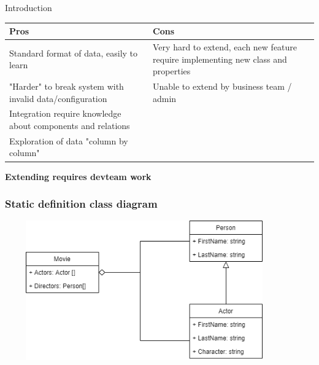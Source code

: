 \documentclass{beamer}
\begin{document}
\begin{section}{Introduction}
\begin{frame}
\begin{center}

\begin{tabular}{ | m{5.2cm} |  m{5.2cm} | }

\hline
 Pros & Cons \\ 
\hline \hline
Standard format of data, easily to learn & Very hard to extend, each new feature require implementing new class and properties \\  
\hline
 "Harder" to break system with invalid data/configuration & Unable to extend by business team / admin \\
\hline
Integration require knowledge about components and relations & \\ 
\hline
Exploration of data "column by column" & \\
\hline

\end{tabular}

\textbf{Extending requires devteam work}

\end{center}

\end{frame}


\begin{frame}
\frametitle{Static definition class diagram}
\centering
 \includegraphics[width=12cm, height=6cm]{Standard.png}
\end{frame}

\end{section}
\end{document}
